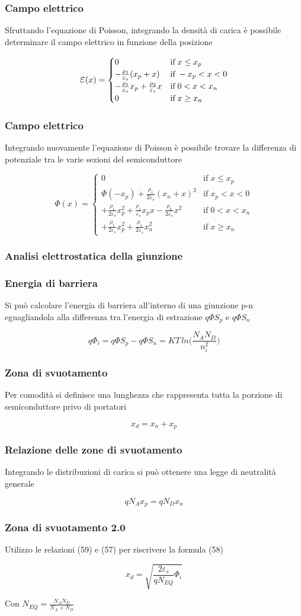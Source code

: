 \documentclass[12pt,a4paper]{article}
\newcommand{\Beps}{ \mathlarger{\mathlarger{ \varepsilon }}}
\newcommand{\eqlist}[4]{ 
	\subsubsection*{#1}
	\parbox{19cm}{#2}
	
	\begin{equation}
	#3
	\end{equation}
	\noindent\parbox{19cm}{#4}}
\begin{document}
		\eqlist{Campo elettrico}
		{Sfruttando l'equazione di Poisson, integrando la densità di carica è possibile determinare il campo elettrico in funzione della posizione}
		{\Beps(x) = \begin{cases} 
				0 & \mbox{if}\; x \leq x_{p} \\
				-\frac{\rho_{1}}{\varepsilon_{s}}(x_{p}+x) & \mbox{if}\; -x_{p} < x < 0 \\
				-\frac{\rho_{1}}{\varepsilon_{s}} x_{p}+ \frac{\rho_{2}}{\varepsilon_{s}}x & \mbox{if}\; 0 < x < x_{n} \\ 
				 0 &\mbox{if}\; x \geq x_{n} \end{cases}}
		{}
		
		\eqlist{Campo elettrico}
		{Integrando nuovamente l'equazione di Poisson è possibile trovare la differenza di potenziale tra le varie sezioni del semiconduttore}
		{\Phi(x) = \begin{cases} 
				0 & \mbox{if}\; x \leq x_{p} \\
				\Phi(-x_{p})+ \frac{\rho_{1}}{2\varepsilon_{s}}(x_{n}+x)^{2} & \mbox{if}\; x_{p} < x <0 \\
				+\frac{\rho_{1}}{2\varepsilon_{s}}x_{p}^{2} + \frac{\rho_{1}}{\varepsilon_{s}}x_{p}x - \frac{\rho_{2}}{2\varepsilon_{s}}x^{2} & \mbox{if}\;  0< x < x_{n} \\
				+\frac{\rho_{1}}{2\varepsilon_{s}}x_{p}^{2} + \frac{\rho_{1}}{2\varepsilon_{s}}x_{n}^{2} & \mbox{if}\; x \geq x_{n} \end{cases}}
		{}
		\subsubsection{Analisi elettrostatica della giunzione}
		
		\eqlist{Energia di barriera}
		{Si  può calcolare l'energia di barriera all'interno di una giunzione p-n eguagliandola alla differenza tra l'energia di estrazione $ q \Phi S_{p} $ e $ q \Phi S_{n}  $}
		{q\Phi_{i} =  q \Phi S_{p} -q \Phi S_{n}  = KT \, ln\Big(\frac{N_{A}N_{D}}{n_{i}^{2}}\Big)}
		{}
		
		\eqlist{Zona di svuotamento}
		{Per comodità si definisce una lunghezza che rappresenta tutta la porzione di semiconduttore privo di portatori}
		{x_{d} = x_{n} + x_{p}}
		{}
		
		\eqlist{Relazione delle zone di svuotamento}
		{Integrando le distribuzioni di carica si può ottenere una legge di neutralità generale}
		{q N_{A} x_{p} = q N_{D} x_{n}}
		{}
		
		\eqlist{Zona di svuotamento 2.0}
		{Utilizzo le relazioni (59) e (57) per riscrivere la formula (58) }
		{x_{d} = \sqrt{\frac{2 \varepsilon_{s}}{q N_{EQ}} \Phi_{i}}}
		{Con $ N_{EQ} = \frac{N_{A} N_{D}}{N_{A} + N_{D}} $}
		
\end{document}

